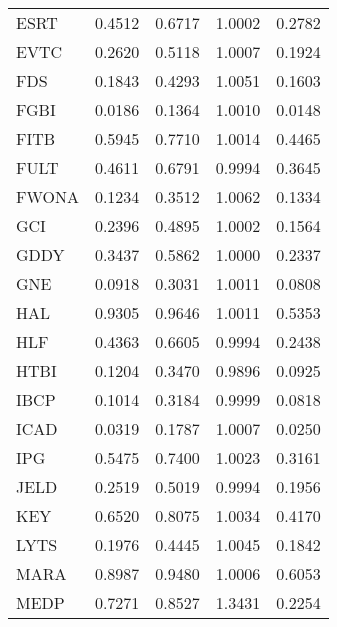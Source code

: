 \begin{table}
\begin{tabular}{lrrrr}
ESRT & 0.4512 & 0.6717 & 1.0002 & 0.2782 \\
EVTC & 0.2620 & 0.5118 & 1.0007 & 0.1924 \\
FDS & 0.1843 & 0.4293 & 1.0051 & 0.1603 \\
FGBI & 0.0186 & 0.1364 & 1.0010 & 0.0148 \\
FITB & 0.5945 & 0.7710 & 1.0014 & 0.4465 \\
FULT & 0.4611 & 0.6791 & 0.9994 & 0.3645 \\
FWONA & 0.1234 & 0.3512 & 1.0062 & 0.1334 \\
GCI & 0.2396 & 0.4895 & 1.0002 & 0.1564 \\
GDDY & 0.3437 & 0.5862 & 1.0000 & 0.2337 \\
GNE & 0.0918 & 0.3031 & 1.0011 & 0.0808 \\
HAL & 0.9305 & 0.9646 & 1.0011 & 0.5353 \\
HLF & 0.4363 & 0.6605 & 0.9994 & 0.2438 \\
HTBI & 0.1204 & 0.3470 & 0.9896 & 0.0925 \\
IBCP & 0.1014 & 0.3184 & 0.9999 & 0.0818 \\
ICAD & 0.0319 & 0.1787 & 1.0007 & 0.0250 \\
IPG & 0.5475 & 0.7400 & 1.0023 & 0.3161 \\
JELD & 0.2519 & 0.5019 & 0.9994 & 0.1956 \\
KEY & 0.6520 & 0.8075 & 1.0034 & 0.4170 \\
LYTS & 0.1976 & 0.4445 & 1.0045 & 0.1842 \\
MARA & 0.8987 & 0.9480 & 1.0006 & 0.6053 \\
MEDP & 0.7271 & 0.8527 & 1.3431 & 0.2254 \\
\bottomrule
\end{tabular}
\end{table}
